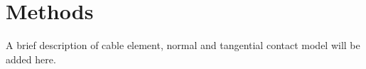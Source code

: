 \newcommand{\pluseq}{\mathrel{+}=} %
%
\section{Methods}
A brief description of cable element, normal and tangential contact model will be added here.
 
%
%
%
